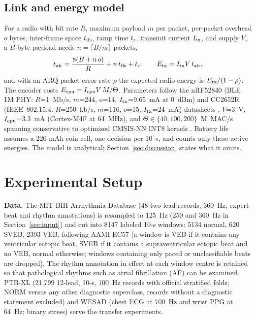 \documentclass[journal]{IEEEtran}
\begin{document}
\subsection{Link and energy model}\label{sec:energymethod}
For a radio with bit rate $R$, maximum payload $m$ per packet, per-packet overhead $o$ bytes, inter-frame space $t_{\rm ifs}$, ramp time $t_{\rm r}$, transmit current $I_{\rm tx}$, and supply $V$, a $B$-byte payload needs $n=\lceil B/m\rceil$ packets,
\begin{equation}
t_{\rm air}=\frac{8(B+n\,o)}{R}+n\,t_{\rm ifs}+t_{\rm r},\qquad E_{\rm tx}=I_{\rm tx}V\,t_{\rm air},
\end{equation}
and with an ARQ packet-error rate $\rho$ the expected radio energy is $E_{\rm tx}/(1-\rho)$. The encoder costs $E_{\rm cpu}=I_{\rm cpu}V\,M/\Theta$. Parameters follow the nRF52840 (BLE 1M PHY: $R$=1~Mb/s, $m$=244, $o$=14, $I_{\rm tx}$=9.65~mA at 0~dBm) and CC2652R (IEEE~802.15.4: $R$=250~kb/s, $m$=116, $o$=15, $I_{\rm tx}$=24~mA) datasheets \cite{nrf52840,cc2652r}, $V$=3~V, $I_{\rm cpu}$=3.3~mA (Cortex-M4F at 64~MHz), and $\Theta\in\{40,100,200\}$~M~MAC/s spanning conservative to optimized CMSIS-NN INT8 kernels \cite{lai2018}. Battery life assumes a 220-mAh coin cell, one decision per 10~s, and counts only these active energies. The model is analytical; Section~\ref{sec:discussion} states what it omits.

\section{Experimental Setup}
\textbf{Data.} The MIT-BIH Arrhythmia Database \cite{moody2001,goldberger2000} (48 two-lead records, 360~Hz, expert beat and rhythm annotations) is resampled to 125~Hz (250 and 360~Hz in Section~\ref{sec:input}) and cut into 8147 labeled 10-s windows: 5134 normal, 620 SVEB, 2393 VEB, following AAMI EC57 (a window is VEB if it contains any ventricular ectopic beat, SVEB if it contains a supraventricular ectopic beat and no VEB, normal otherwise; windows containing only paced or unclassifiable beats are dropped). The rhythm annotation in effect at each window centre is retained so that pathological rhythms such as atrial fibrillation (AF) can be examined. PTB-XL \cite{wagner2020} (21,799 12-lead, 10-s, 100~Hz records with official stratified folds; NORM versus any other diagnostic superclass, records without a diagnostic statement excluded) and WESAD \cite{schmidt2018} (chest ECG at 700~Hz and wrist PPG at 64~Hz; binary stress) serve the transfer experiments.
\end{document}
